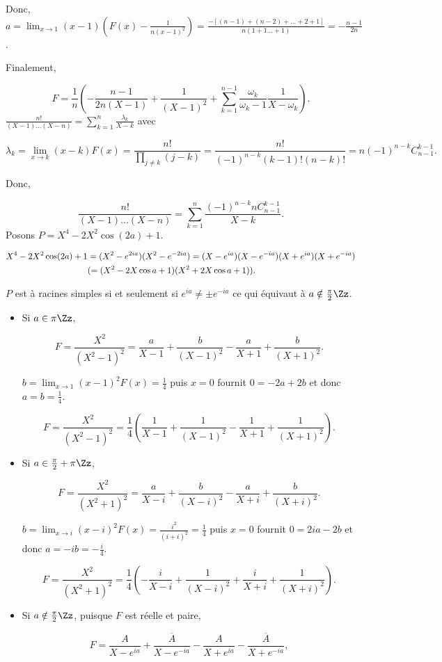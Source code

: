 {{Donc, $a=\lim_{x\rightarrow 1}(x-1)(F(x)-\frac{1}{n(x-1)^2})=\frac{-[(n-1)+(n-2)+...+2+1]}{n(1+1...+1)}=-\frac{n-1}{2n}$.

Finalement,

$$F=\frac{1}{n}(-\frac{n-1}{2n(X-1)}+\frac{1}{(X-1)^2}+\sum_{k=1}^{n-1}\frac{\omega_k}{\omega_k-1}\frac{1}{X-\omega_k}).$$
$\frac{n!}{(X-1)...(X-n)}=\sum_{k=1}^{n}\frac{\lambda_k}{X-k}$ avec

$$\lambda_k=\lim_{x\rightarrow k}(x-k)F(x)=\frac{n!}{\prod_{j\neq k}^{}(j-k)}=\frac{n!}{(-1)^{n-k}(k-1)!(n-k)!}=n(-1)^{n-k}C_{n-1}^{k-1}.$$

Donc,

$$\frac{n!}{(X-1)...(X-n)}=\sum_{k=1}^{n}\frac{(-1)^{n-k}nC_{n-1}^{k-1}}{X-k}.$$
Posons $P=X^4-2X^2\cos(2a)+1$.

\begin{align*}\ensuremath
X^4-2X^2\cos(2a)+1&=(X^2-e^{2ia})(X^2-e^{-2ia})=(X-e^{ia})(X-e^{-ia})(X+e^{ia})(X+e^{-ia})\\
 &(=(X^2-2X\cos a+1)(X^2+2X\cos a+1)).
\end{align*}

$P$ est à racines simples si et seulement si $e^{ia}\neq\pm e^{-ia}$ ce qui équivaut à $a\notin\frac{\pi}{2}\Zz$.

\begin{itemize}
\item[1er cas.] Si $a\in\pi\Zz$,

$$F=\frac{X^2}{(X^2-1)^2}=\frac{a}{X-1}+\frac{b}{(X-1)^2}-\frac{a}{X+1}+\frac{b}{(X+1)^2}.$$

$b=\lim_{x\rightarrow 1}(x-1)^2F(x)=\frac{1}{4}$ puis $x=0$ fournit $0=-2a+2b$ et donc $a=b=\frac{1}{4}$.

$$F=\frac{X^2}{(X^2-1)^2}=\frac{1}{4}(\frac{1}{X-1}+\frac{1}{(X-1)^2}-\frac{1}{X+1}+\frac{1}{(X+1)^2}).$$
\item[2ème cas.] Si $a\in\frac{\pi}{2}+\pi\Zz$,

$$F=\frac{X^2}{(X^2+1)^2}=\frac{a}{X-i}+\frac{b}{(X-i)^2}-\frac{a}{X+i}+\frac{b}{(X+i)^2}.$$

$b=\lim_{x\rightarrow i}(x-i)^2F(x)=\frac{i^2}{(i+i)^2}=\frac{1}{4}$ puis $x=0$ fournit $0=2ia-2b$ et donc $a=-ib=-\frac{i}{4}$.

$$F=\frac{X^2}{(X^2+1)^2}=\frac{1}{4}(-\frac{i}{X-i}+\frac{1}{(X-i)^2}+\frac{i}{X+i}+\frac{1}{(X+i)^2}).$$
\item[3ème cas.] Si $a\notin\frac{\pi}{2}\Zz$, puisque $F$ est réelle et paire,

$$F=\frac{A}{X-e^{ia}}+\frac{\overline{A}}{X-e^{-ia}}-\frac{A}{X+e^{ia}}-\frac{\overline{A}}{X+e^{-ia}},$$


\end{itemize}}}
